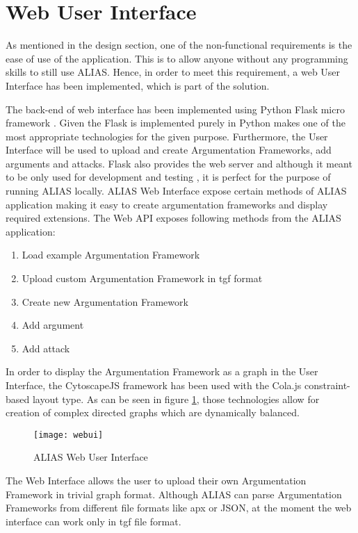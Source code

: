 \section{Web User Interface}
As mentioned in the design section, one of the non-functional requirements is the ease of use of the application. This is to allow anyone without any programming skills to still use ALIAS. Hence, in order to meet this requirement, a web User Interface has been implemented, which is part of the solution.

The back-end of web interface has been implemented using Python Flask micro framework \citep{flaskDocs}. Given the Flask is implemented purely in Python makes one of the most appropriate technologies for the given purpose. Furthermore, the User Interface will be used to upload and create Argumentation Frameworks, add arguments and attacks. Flask also provides the web server and although it meant to be only used for development and testing \citep{flaskBook}, it is perfect for the purpose of running ALIAS locally. ALIAS Web Interface expose certain methods of ALIAS application making it easy to create argumentation frameworks and display required extensions. The Web API exposes following methods from the ALIAS application:
\begin{enumerate}
	\item Load example Argumentation Framework
	\item Upload custom Argumentation Framework in tgf format
	\item Create new Argumentation Framework
	\item Add argument
	\item Add attack
\end{enumerate}

In order to display the Argumentation Framework as a graph in the User Interface, the CytoscapeJS \citep{cytoscapejs} framework has been used with the Cola.js constraint-based layout type. As can be seen in figure \ref{fig:webUi}, those technologies allow for creation of complex directed graphs which are dynamically balanced.

\begin{figure}[h]
	\texttt{[image: webui]}
	\caption{ALIAS Web User Interface}
	\label{fig:webUi}
\end{figure}

The Web Interface allows the user to upload their own Argumentation Framework in trivial graph format. Although ALIAS can parse Argumentation Frameworks from different file formats like apx or JSON, at the moment the web interface can work only in tgf file format. 

